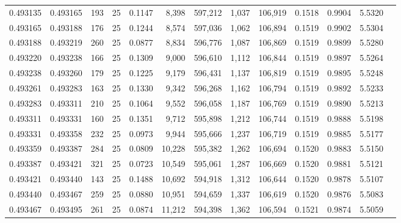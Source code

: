 \begin{tabular}{rrrrrrrrrrrrr}
0.493135 & 0.493165 & 193 &  25 &                                     0.1147 &   8,398 & 597,212 &   1,037 & 106,919 & 0.1518 & 0.9904 & 5.5320 \\
0.493165 & 0.493188 & 176 &  25 &                                     0.1244 &   8,574 & 597,036 &   1,062 & 106,894 & 0.1519 & 0.9902 & 5.5304 \\
0.493188 & 0.493219 & 260 &  25 &                                     0.0877 &   8,834 & 596,776 &   1,087 & 106,869 & 0.1519 & 0.9899 & 5.5280 \\
0.493220 & 0.493238 & 166 &  25 &                                     0.1309 &   9,000 & 596,610 &   1,112 & 106,844 & 0.1519 & 0.9897 & 5.5264 \\
0.493238 & 0.493260 & 179 &  25 &                                     0.1225 &   9,179 & 596,431 &   1,137 & 106,819 & 0.1519 & 0.9895 & 5.5248 \\
0.493261 & 0.493283 & 163 &  25 &                                     0.1330 &   9,342 & 596,268 &   1,162 & 106,794 & 0.1519 & 0.9892 & 5.5233 \\
0.493283 & 0.493311 & 210 &  25 &                                     0.1064 &   9,552 & 596,058 &   1,187 & 106,769 & 0.1519 & 0.9890 & 5.5213 \\
0.493311 & 0.493331 & 160 &  25 &                                     0.1351 &   9,712 & 595,898 &   1,212 & 106,744 & 0.1519 & 0.9888 & 5.5198 \\
0.493331 & 0.493358 & 232 &  25 &                                     0.0973 &   9,944 & 595,666 &   1,237 & 106,719 & 0.1519 & 0.9885 & 5.5177 \\
0.493359 & 0.493387 & 284 &  25 &                                     0.0809 &  10,228 & 595,382 &   1,262 & 106,694 & 0.1520 & 0.9883 & 5.5150 \\
0.493387 & 0.493421 & 321 &  25 &                                     0.0723 &  10,549 & 595,061 &   1,287 & 106,669 & 0.1520 & 0.9881 & 5.5121 \\
0.493421 & 0.493440 & 143 &  25 &                                     0.1488 &  10,692 & 594,918 &   1,312 & 106,644 & 0.1520 & 0.9878 & 5.5107 \\
0.493440 & 0.493467 & 259 &  25 &                                     0.0880 &  10,951 & 594,659 &   1,337 & 106,619 & 0.1520 & 0.9876 & 5.5083 \\
0.493467 & 0.493495 & 261 &  25 &                                     0.0874 &  11,212 & 594,398 &   1,362 & 106,594 & 0.1521 & 0.9874 & 5.5059 \\

\end{tabular}
